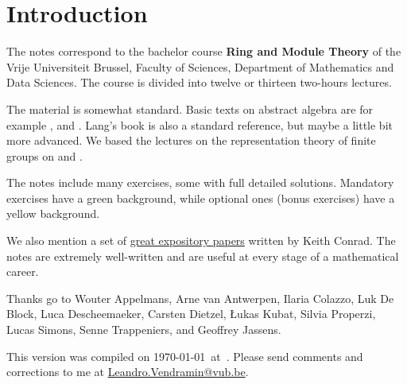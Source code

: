 \thispagestyle{plain}

\section*{Introduction}

The notes correspond to the bachelor 
course \textbf{Ring and Module Theory} of the 
Vrije Universiteit Brussel, 
Faculty of Sciences, 
Department of Mathematics and Data Sciences. The course
is divided into twelve or thirteen two-hours lectures. 

The material is somewhat standard. Basic texts on abstract algebra
are for example \cite{MR1129886}, \cite{MR2286236} and \cite{MR600654}. 
Lang's book \cite{MR783636} is also a standard reference, but 
maybe a little bit more advanced. 
We based the lectures on the representation theory of finite
groups on \cite{MR0450380} and 
\cite{MR2867444}. 

The notes include many exercises, some with full detailed solutions. Mandatory exercises have a \colorbox{green!5!white}{green background}, while optional ones (bonus exercises) have a \colorbox{yellow!15!white}{yellow background}.


We also mention a set of \href{https://kconrad.math.uconn.edu/blurbs/}{great expository papers} written 
by Keith Conrad. 
The notes are extremely well-written and are useful at  
every stage of a mathematical career. 


Thanks go to Wouter Appelmans, Arne van Antwerpen, Ilaria Colazzo, Luk De Block, 
Luca Descheemaeker, Carsten Dietzel, {\L}ukas Kubat, Silvia Properzi, Lucas Simons, Senne Trappeniers, 
and Geoffrey Jassens. 

This version 
was compiled on \today~at~\currenttime. 
Please send comments and corrections to me at \url{Leandro.Vendramin@vub.be}. 


